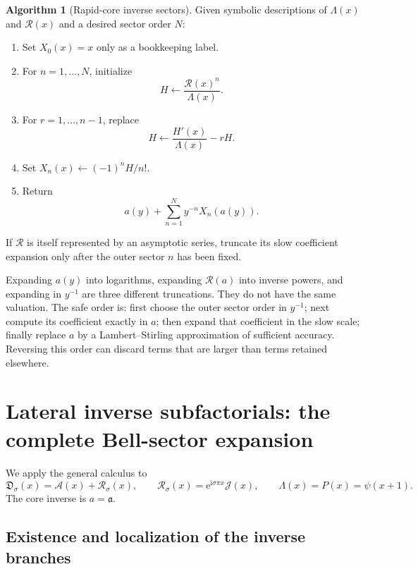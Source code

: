\documentclass[11pt,a4paper]{article}
\numberwithin{equation}{section}
\theoremstyle{definition}
\newtheorem{algorithm}[theorem]{Algorithm}
\theoremstyle{remark}
\newcommand{\e}{\mathrm e}
\newcommand{\ii}{\mathrm i}
\newcommand{\Sub}{\mathfrak D}
\newcommand{\Core}{\mathcal A}
\newcommand{\Tail}{\mathcal J}
\newcommand{\InvCore}{\mathfrak a}
\newcommand{\Lam}{\Lambda}
\newcommand{\Res}{\mathcal R}
\begin{document}
\begin{algorithm}[Rapid-core inverse sectors]\label{alg:rapid-core}
Given symbolic descriptions of $\Lam(x)$ and $\Res(x)$ and a desired sector
order $N$:
\begin{enumerate}
\item Set $X_0(x)=x$ only as a bookkeeping label.
\item For $n=1,\ldots,N$, initialize
\[
 H\leftarrow\frac{\Res(x)^n}{\Lam(x)}.
\]
\item For $r=1,\ldots,n-1$, replace
\[
 H\leftarrow\frac{H'(x)}{\Lam(x)}-rH.
\]
\item Set $X_n(x)\leftarrow(-1)^nH/n!$.
\item Return
\[
 a(y)+\sum_{n=1}^{N}y^{-n}X_n(a(y)).
\]
\end{enumerate}
If $\Res$ is itself represented by an asymptotic series, truncate its slow
coefficient expansion only after the outer sector $n$ has been fixed.
\end{algorithm}

\begin{warningbox}[title={A scale-ordering trap}]
Expanding $a(y)$ into logarithms, expanding $\Res(a)$ into inverse powers,
and expanding in $y^{-1}$ are three different truncations.  They do not have
the same valuation.  The safe order is: first choose the outer sector order
in $y^{-1}$; next compute its coefficient exactly in $a$; then expand that
coefficient in the slow scale; finally replace $a$ by a Lambert--Stirling
approximation of sufficient accuracy.  Reversing this order can discard
terms that are larger than terms retained elsewhere.
\end{warningbox}

\section{Lateral inverse subfactorials: the complete Bell-sector expansion}
\label{sec:lateral-inverse}

We apply the general calculus to
\begin{equation}\label{eq:sub-as-core-tail-again}
 \Sub_\sigma(x)=\Core(x)+\Res_\sigma(x),
 \qquad
 \Res_\sigma(x)=\e^{\ii\sigma\pi x}\Tail(x),
 \qquad
 \Lam(x)=P(x)=\psi(x+1).
\end{equation}
The core inverse is $a=\InvCore$.

\subsection{Existence and localization of the inverse branches}
\end{document}

